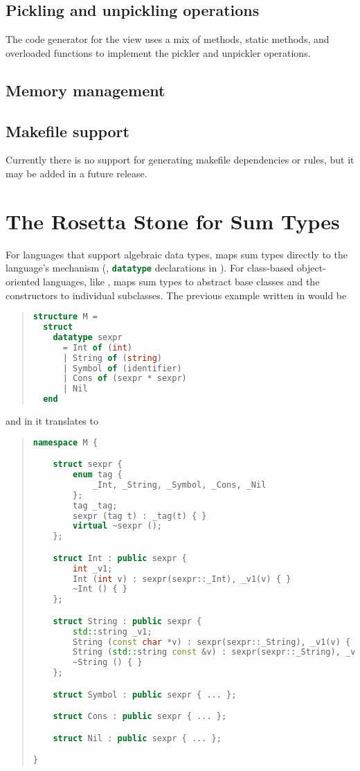\subsection{Pickling and unpickling operations}

The code generator for the \Cplusplus{} view uses a mix of methods, static methods,
and overloaded functions to implement the pickler and unpickler operations.

\subsection{Memory management}

\subsection{Makefile support}
Currently there is no support for generating makefile dependencies or rules,
but it may be added in a future release.


\section{The Rosetta Stone for Sum Types}
\label{sec:rosetta-stone}

For languages that support algebraic data types, \asdlgen{} maps sum types directly
to the language's mechanism (\eg{}, \lstinline[language=SML]!datatype! declarations
in \sml{}).
For class-based object-oriented languages, like \Cplusplus{}, \asdlgen{} maps
sum types to abstract base classes and the constructors to individual subclasses.
The previous example written in \sml{} would be
\begin{quote}\begin{lstlisting}[language=SML]
structure M =
  struct
    datatype sexpr
      = Int of (int)
      | String of (string)
      | Symbol of (identifier)
      | Cons of (sexpr * sexpr)
      | Nil
  end
\end{lstlisting}\end{quote}%
and in \Cplusplus{} it translates to
\begin{quote}\begin{lstlisting}[language=c++]
namespace M {

    struct sexpr {
        enum tag {
            _Int, _String, _Symbol, _Cons, _Nil
        };
        tag _tag;
        sexpr (tag t) : _tag(t) { }
        virtual ~sexpr ();
    };

    struct Int : public sexpr {
        int _v1;
        Int (int v) : sexpr(sexpr::_Int), _v1(v) { }
        ~Int () { }
    };

    struct String : public sexpr {
        std::string _v1;
        String (const char *v) : sexpr(sexpr::_String), _v1(v) { }
        String (std::string const &v) : sexpr(sexpr::_String), _v1(v) { }
        ~String () { }
    };

    struct Symbol : public sexpr { ... };

    struct Cons : public sexpr { ... };

    struct Nil : public sexpr { ... };

}
\end{lstlisting}\end{quote}%
